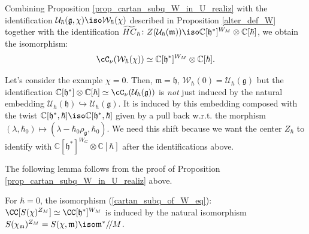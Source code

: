 \documentclass[12pt]{amsart}
\begin{document}
Combining Proposition \ref{prop_cartan_subq_W_in_U_realiz} with the identification $\mathcal{U}_\hbar(\mathfrak{g},\chi) \iso \mathcal{W}_\hbar(\chi)$ described in Proposition \ref{alter_def_W} together with the identification $\widetilde{HC}_{\hbar}\colon Z(\mathcal{U}_\hbar(\mathfrak{m})) \iso \mathbb{C}[\mathfrak{h}^*]^{W_M} \otimes \mathbb{C}[\hbar]$, we obtain the isomorphism: 
\begin{equation}\label{cartan_subq_of_W_eq}
\cC_\nu(\mathcal{W}_\hbar(\chi)) \simeq \mathbb{C}[\mathfrak{h}^*]^{W_M} \otimes \mathbb{C}[\hbar].
\end{equation}


\begin{example*}
Let's consider the example $\chi=0$.   Then, $\mathfrak{m}=\mathfrak{h}$, $\mathcal{W}_\hbar(0)=\mathcal{U}_\hbar(\mathfrak{g})$ but the identification $\mathbb{C}[\mathfrak{h}^*] \otimes \mathbb{C}[\hbar] \simeq \cC_\nu(\mathcal{U}_\hbar(\mathfrak{g}))$ is {\emph{not}} just induced by the natural embedding $\mathcal{U}_\hbar(\mathfrak{h}) \hookrightarrow \mathcal{U}_\hbar(\mathfrak{g})$. It is induced by this embedding composed with the twist $\mathbb{C}[\mathfrak{h}^*,\hbar] \iso \mathbb{C}[\mathfrak{h}^*,\hbar]$ given by a pull back w.r.t. the morphism $(\lambda,\hbar_0) \mapsto (\lambda-\hbar_0\rho_{\mathfrak{g}},\hbar_0)$. We need this shift because we want the center $Z_\hbar$ to identify with $\mathbb{C}[\mathfrak{h}^*]^{W_G} \otimes \mathbb{C}[\hbar]$ after the identifications above.  
\end{example*}





 




The following lemma follows from the proof of Proposition \ref{prop_cartan_subq_W_in_U_realiz} above.
\begin{lemma}\label{induced_ident_hbar_0}
For $\hbar=0$, the isomorphism (\ref{cartan_subq_of_W_eq}): $\CC[S(\chi)^{Z_M}] \simeq \CC[\mathfrak{h}^*]^{W_M}$ is induced by the natural isomorphism $S(\chi_{\mathfrak{m}})^{Z_M}=S(\chi,\mathfrak{m}) \iso \mathfrak{m}^*/\!/M$.
\end{lemma}
\end{document}
